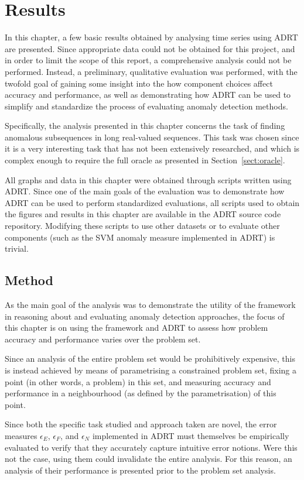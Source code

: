 \chapter{Results}
\label{ch:results}

In this chapter, a few basic results obtained by analysing time series using ADRT are presented. Since appropriate data could not be obtained for this project, and in order to limit the scope of this report, a comprehensive analysis could not be performed. Instead, a preliminary, qualitative evaluation was performed, with the twofold goal of gaining some insight into the how component choices affect accuracy and performance, as well as demonstrating how ADRT can be used to simplify and standardize the process of evaluating anomaly detection methods.

Specifically, the analysis presented in this chapter concerns the task of finding anomalous subsequences in long real-valued sequences. This task was chosen since it is a very interesting task that has not been extensively researched, and which is complex enough to require the full oracle as presented in Section~\ref{sect:oracle}.

All graphs and data in this chapter were obtained through scripts written using ADRT. Since one of the main goals of the evaluation was to demonstrate how ADRT can be used to perform standardized evaluations, all scripts used to obtain the figures and results in this chapter are available in the ADRT source code repository. Modifying these scripts to use other datasets or to evaluate other components (such as the SVM anomaly measure implemented in ADRT) is trivial.

\section{Method}
As the main goal of the analysis was to demonstrate the utility of the framework in reasoning about and evaluating anomaly detection approaches, the focus of this chapter is on using the framework and ADRT to assess how problem accuracy and performance varies over the problem set.

Since an analysis of the entire problem set would be prohibitively expensive, this is instead achieved by means of parametrising a constrained problem set, fixing a point (in other words, a problem) in this set, and measuring accuracy and performance in a neighbourhood (as defined by the parametrisation) of this point.

Since both the specific task studied and approach taken are novel, the error measures $\epsilon_E$, $\epsilon_F$, and $\epsilon_N$ implemented in ADRT must themselves be empirically evaluated to verify that they accurately capture intuitive error notions. Were this not the case, using them could invalidate the entire analysis. For this reason, an analysis of their performance is presented prior to the problem set analysis.

